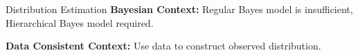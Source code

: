 \begin{block}{Distribution Estimation}
\centering
            {\large \textbf{Bayesian Context:} Regular Bayes model is insufficient, Hierarchical Bayes model required.}
           
           {\large \textbf{Data Consistent Context:} Use data to construct observed distribution.}
           
           {\large \  }

             
\end{block}

\vspace{-0.75cm}
